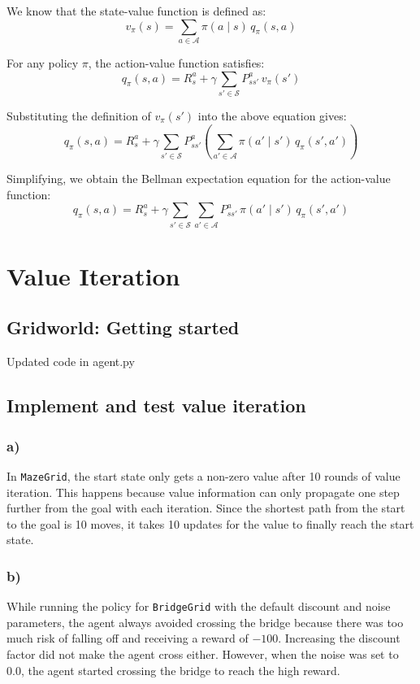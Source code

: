 \documentclass[11pt]{article}
\begin{document}
We know that the state-value function is defined as:
\[
v_{\pi}(s) = \sum_{a \in \mathcal{A}} \pi(a \mid s) \, q_{\pi}(s,a)
\]

For any policy $\pi$, the action-value function satisfies:
\[
q_{\pi}(s,a)
= R_s^a + \gamma \sum_{s' \in \mathcal{S}} P_{ss'}^a \, v_{\pi}(s')
\]

Substituting the definition of $v_{\pi}(s')$ into the above equation gives:
\[
q_{\pi}(s,a)
= R_s^a + \gamma \sum_{s' \in \mathcal{S}} P_{ss'}^a 
   \left( \sum_{a' \in \mathcal{A}} \pi(a' \mid s') \, q_{\pi}(s',a') \right)
\]

Simplifying, we obtain the Bellman expectation equation for the action-value function:
\[
\boxed{
q_{\pi}(s,a)
= R_s^a + \gamma \sum_{s' \in \mathcal{S}} \sum_{a' \in \mathcal{A}} 
      P_{ss'}^a \, \pi(a' \mid s') \, q_{\pi}(s',a')
}
\]

\section{Value Iteration}
\subsection{Gridworld: Getting started}

Updated code in agent.py

\subsection{Implement and test value iteration}
\subsubsection*{a)} In \texttt{MazeGrid}, the start state only gets a non-zero value after 10 rounds of value iteration. This happens because value information can only propagate one step further from the goal with each iteration. Since the shortest path from the start to the goal is 10 moves, it takes 10 updates for the value to finally reach the start state.

\subsubsection*{b)} While running the policy for \texttt{BridgeGrid} with the default discount and noise parameters, the agent always avoided crossing the bridge because there was too much risk of falling off and receiving a reward of $-100$. Increasing the discount factor did not make the agent cross either. However, when the noise was set to $0.0$, the agent started crossing the bridge to reach the high reward. 
\end{document}
